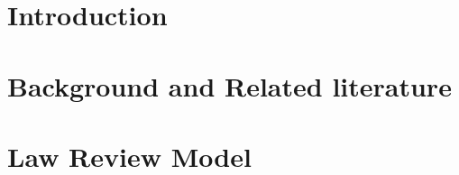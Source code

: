 \documentclass[openbib,12pt]{article}  %
\begin{document}
\begin{abstract}
\vspace{0in}
\end{abstract}

\newpage

\section{Introduction}\label{EMIL_Section:intro}


\section{Background and Related literature}\label{EMIL_Section:inst}



\section{Law Review Model}\label{EMIL_Section:lawreview}





%

%

%

\newpage
\appendix
\end{document}
